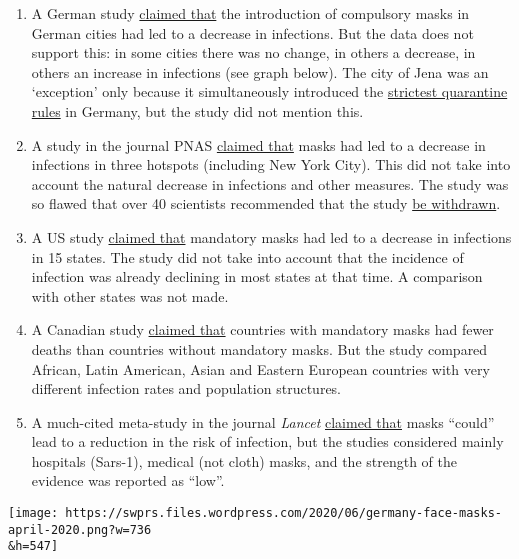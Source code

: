 \begin{enumerate}
\def\labelenumi{\arabic{enumi}.}
\tightlist
\item
  A German study \href{http://ftp.iza.org/dp13319.pdf\#page=28}{claimed
  that} the introduction of compulsory masks in German cities had led to
  a decrease in infections. But the data does not support this: in some
  cities there was no change, in others a decrease, in others an
  increase in infections (see graph below). The city of Jena was an
  `exception' only because it simultaneously introduced the
  \href{https://www.mdr.de/thueringen/ost-thueringen/jena/corona-jena-seit-einer-woche-keine-neuinfektion-100.html}{strictest
  quarantine rules} in Germany, but the study did not mention this.
\item
  A study in the journal PNAS
  \href{https://www.pnas.org/content/117/26/14857}{claimed that} masks
  had led to a decrease in infections in three hotspots (including New
  York City). This did not take into account the natural decrease in
  infections and other measures. The study was so flawed that over 40
  scientists recommended that the study
  \href{https://reason.com/2020/06/22/prominent-researchers-say-a-widely-cited-study-on-wearing-masks-is-badly-flawed/}{be
  withdrawn}.
\item
  A US study
  \href{https://www.healthaffairs.org/doi/full/10.1377/hlthaff.2020.00818}{claimed
  that} mandatory masks had led to a decrease in infections in 15
  states. The study did not take into account that the incidence of
  infection was already declining in most states at that time. A
  comparison with other states was not made.
\item
  A Canadian study
  \href{https://www.medrxiv.org/content/10.1101/2020.05.22.20109231v3.full.pdf}{claimed
  that} countries with mandatory masks had fewer deaths than countries
  without mandatory masks. But the study compared African, Latin
  American, Asian and Eastern European countries with very different
  infection rates and population structures.
\item
  A much-cited meta-study in the journal \emph{Lancet}
  \href{https://www.thelancet.com/journals/lancet/article/PIIS0140-6736(20)31142-9/fulltext}{claimed
  that} masks ``could'' lead to a reduction in the risk of infection,
  but the studies considered mainly hospitals (Sars-1), medical (not
  cloth) masks, and the strength of the evidence was reported as
  ``low''.
\end{enumerate}

\texttt{[image: https://swprs.files.wordpress.com/2020/06/germany-face-masks-april-2020.png?w=736\\\&h=547]}

